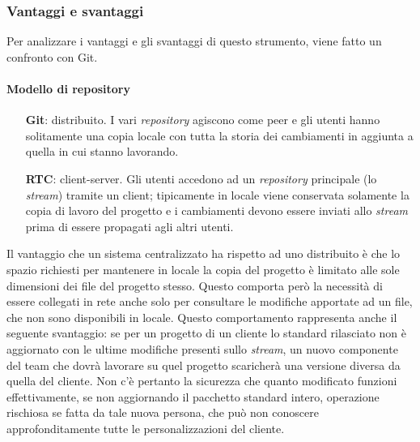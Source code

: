 \subsubsection{Vantaggi e svantaggi}
Per analizzare i vantaggi e gli svantaggi di questo strumento, viene fatto un confronto con Git.
\paragraph*{Modello di repository}
\begin{itemize}
	\item[\textbf{Git}:] distribuito. I vari \textit{repository} agiscono come peer e gli utenti hanno solitamente una copia locale con tutta la storia dei cambiamenti in aggiunta a quella in cui stanno lavorando.
	\item[\textbf{RTC}:] client-server. Gli utenti accedono ad un \textit{repository} principale (lo \textit{stream}) tramite un client; tipicamente in locale viene conservata solamente la copia di lavoro del progetto e i cambiamenti devono essere inviati allo \textit{stream} prima di essere propagati agli altri utenti.
\end{itemize}
Il vantaggio che un sistema centralizzato ha rispetto ad uno distribuito è che lo spazio richiesti per mantenere in locale la copia del progetto è limitato alle sole dimensioni dei file del progetto stesso. Questo comporta però la necessità di essere collegati in rete anche solo per consultare le modifiche apportate ad un file, che non sono disponibili in locale. Questo comportamento rappresenta anche il seguente svantaggio: se per un progetto di un cliente lo standard rilasciato non è aggiornato con le ultime modifiche presenti sullo \textit{stream}, un nuovo componente del team che dovrà lavorare su quel progetto scaricherà una versione diversa da quella del cliente. Non c'è pertanto la sicurezza che quanto modificato funzioni effettivamente, se non aggiornando il pacchetto standard intero, operazione rischiosa se fatta da tale nuova persona, che può non conoscere approfonditamente tutte le personalizzazioni del cliente.

